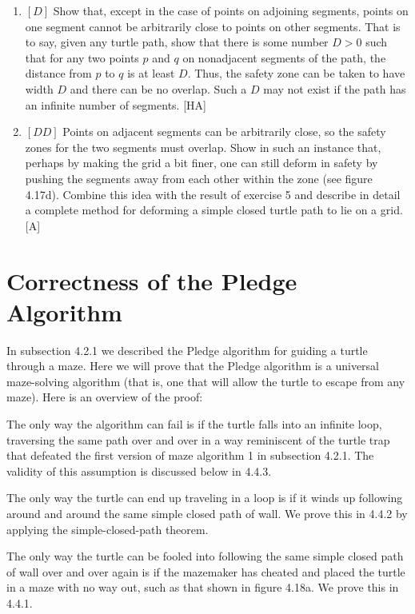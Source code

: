 \documentclass{book}
\begin{document}
\begin{enumerate}
\item $[D]$ Show that, except in the case of points on adjoining segments,
points on one segment cannot be arbitrarily close to points on other
segments. That is to say, given any turtle path, show that there is some
number $D > 0$ such that for any two points $p$ and $q$ on nonadjacent
segments of the path, the distance from $p$ to $q$ is at least $D$. Thus, the
safety zone can be taken to have width $D$ and there can be no overlap.
Such a $D$ may not exist if the path has an infinite number of segments.
[HA]

\item $[DD]$ Points on adjacent segments can be arbitrarily close, so the
safety zones for the two segments must overlap. Show in such an instance
that, perhaps by making the grid a bit finer, one can still deform in
safety by pushing the segments away from each other within the zone
(see figure 4.17d). Combine this idea with the result of exercise 5 and
describe in detail a complete method for deforming a simple closed turtle
path to lie on a grid. [A]
\end{enumerate}

\section{Correctness of the Pledge Algorithm}

In subsection 4.2.1 we described the Pledge algorithm for guiding a turtle
through a maze. Here we will prove that the Pledge algorithm is a
universal maze-solving algorithm (that is, one that will allow the turtle
to escape from any maze). Here is an overview of the proof:

The only way the algorithm can fail is if the turtle falls into an infinite
loop, traversing the same path over and over in a way reminiscent of
the turtle trap that defeated the first version of maze algorithm 1 in
subsection 4.2.1. The validity of this assumption is discussed below in
4.4.3.

The only way the turtle can end up traveling in a loop is if it winds up
following around and around the same simple closed path of wall. We
prove this in 4.4.2 by applying the simple-closed-path theorem.

The only way the turtle can be fooled into following the same simple
closed path of wall over and over again is if the mazemaker has cheated
and placed the turtle in a maze with no way out, such as that shown in
figure 4.18a. We prove this in 4.4.1.
\end{document}
